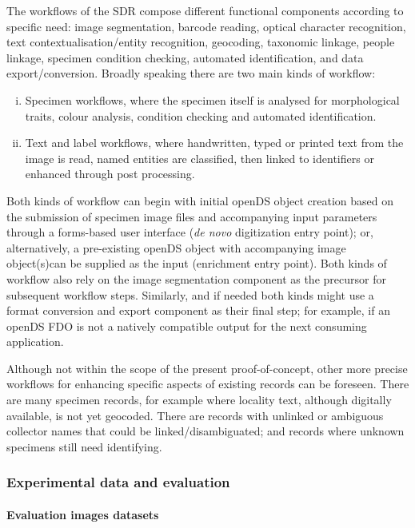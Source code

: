 The workflows of the SDR compose different functional components
according to specific need: image segmentation, barcode reading, optical
character recognition, text contextualisation/entity recognition,
geocoding, taxonomic linkage, people linkage, specimen condition
checking, automated identification, and data export/conversion. Broadly
speaking there are two main kinds of workflow: 

\begin{enumerate}[(i)]
  \item Specimen workflows,
  where the specimen itself is analysed for morphological traits, colour
  analysis, condition checking and automated identification.
  \item Text
  and label workflows, where handwritten, typed or printed text from the
  image is read, named entities are classified, then linked to identifiers
  or enhanced through post processing.
\end{enumerate}

Both kinds of workflow can begin with initial openDS object creation
based on the submission of specimen image files and accompanying input
parameters through a forms-based user interface (\emph{de novo}
digitization entry point); or, alternatively, a pre-existing openDS
object with accompanying image object(s)can be supplied as the input
(enrichment entry point). Both kinds of workflow also rely on the image
segmentation component as the precursor for subsequent workflow steps.
Similarly, and if needed both kinds might use a format conversion and
export component as their final step; for example, if an openDS FDO is
not a natively compatible output for the next consuming application.

Although not within the scope of the present proof-of-concept, other
more precise workflows for enhancing specific aspects of existing
records can be foreseen. There are many specimen records, for example
where locality text, although digitally available, is not yet geocoded.
There are records with unlinked or ambiguous collector names that could
be linked/disambiguated; and records where unknown specimens still need
identifying.

\subsubsection{Experimental data and evaluation}\label{experimental-data-and-evaluation}

\paragraph{Evaluation images datasets}\label{evaluation-images-datasets}

